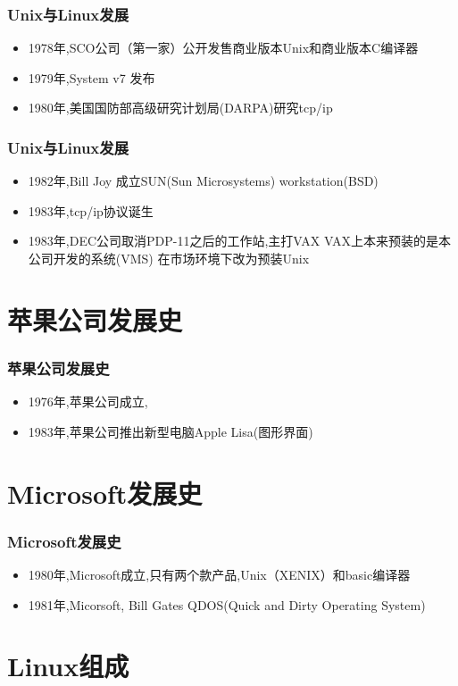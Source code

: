 \documentclass{ctexbeamer}
\begin{document}
\begin{frame}
    \frametitle{Unix与Linux发展}
    \begin{itemize}
    \item 1978年,SCO公司（第一家）公开发售商业版本Unix和商业版本C编译器
    \item 1979年,System v7 发布
    \item 1980年,美国国防部高级研究计划局(DARPA)研究tcp/ip
    \end{itemize}
\end{frame}
\begin{frame}
    \frametitle{Unix与Linux发展}
    \begin{itemize}
    \item 1982年,Bill Joy 成立SUN(Sun Microsystems)
        workstation(BSD)
    \item 1983年,tcp/ip协议诞生
    \item 1983年,DEC公司取消PDP-11之后的工作站,主打VAX
        VAX上本来预装的是本公司开发的系统(VMS)
        在市场环境下改为预装Unix
    \end{itemize}
\end{frame}
\section{苹果公司发展史}
\begin{frame}
    \frametitle{苹果公司发展史}
    \begin{itemize}
    \item 1976年,苹果公司成立,
    \item 1983年,苹果公司推出新型电脑Apple Lisa(图形界面)
    \end{itemize}
\end{frame}
\section{Microsoft发展史}
\begin{frame}
    \frametitle{Microsoft发展史}
    \begin{itemize}
    \item 1980年,Microsoft成立,只有两个款产品,Unix（XENIX）和basic编译器
    \item 1981年,Micorsoft, Bill Gates
        QDOS(Quick and Dirty Operating System)
    \end{itemize}
\end{frame}


\section{Linux组成}
\end{document}
